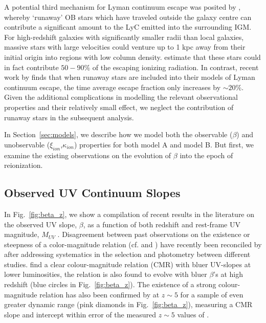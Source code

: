 A potential third mechanism for Lyman continuum escape was posited by \citet{Conroy:2012fc}, whereby `runaway' OB stars which have traveled outside the galaxy centre can contribute a significant amount to the LyC emitted into the surrounding IGM. For high-redshift galaxies with significantly smaller radii than local galaxies, massive stars with large velocities could venture up to 1 kpc away from their initial origin into regions with low column density. \citet{Conroy:2012fc} estimate that these stars could in fact contribute $50 - 90\%$ of the escaping ionizing radiation. In contrast, recent work by \citet{Kimm:2014gv} finds that when runaway stars are included into their models of Lyman continuum escape, the time average escape fraction only increases by $\sim20\%$. Given the additional complications in modelling the relevant observational properties and their relatively small effect, we neglect the contribution of runaway stars in the subsequent analysis. 

In Section~\ref{sec:models}, we describe how we model both the observable ($\beta$) and unobservable ($\xi_{ion}$,$\kappa_{ion}$) properties for both model A and model B. But first, we examine the existing observations on the evolution of $\beta$ into the epoch of reionization.

\subsection{Observed UV Continuum Slopes}\label{sec:betas}
In Fig.~\ref{fig:beta_z}, we show a compilation of recent results in the literature on the observed UV slope, $\beta$, as a function of both redshift and rest-frame UV magnitude, $M_{UV}$ \citep{Dunlop:2011jl,Dunlop:2013kp,Wilkins:2011fs,2012ApJ...756..164F,Bouwens:2013vf,Duncan:2014gh,Rogers:2014bn}. Disagreement between past observations on the existence or steepness of a color-magnitude relation (cf. \citet{Dunlop:2011jl} and \citet{Bouwens:2011tj}) have recently been reconciled by \citet{Bouwens:2013vf} after addressing systematics in the selection and photometry between different studies. \citet{Bouwens:2013vf} find a clear colour-magnitude relation (CMR) with bluer UV-slopes at lower luminosities, the relation is also found to evolve with bluer $\beta$'s at high redshift (blue circles in Fig.~\ref{fig:beta_z}). The existence of a strong colour-magnitude relation has also been confirmed by \citet{Rogers:2014bn} at $z\sim5$ for a sample of even greater dynamic range (pink diamonds in Fig.~\ref{fig:beta_z}), measuring a CMR slope and intercept within error of the measured $z\sim5$ values of \citet{Bouwens:2013vf}.

